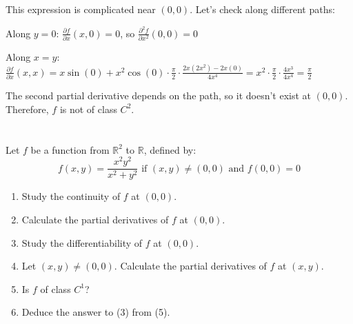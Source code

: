 \documentclass[12pt]{article}
\begin{document}
\begin{correctionbox}
This expression is complicated near $(0,0)$. Let's check along different paths:

Along $y=0$: $\frac{\partial f}{\partial x}(x,0) = 0$, so $\frac{\partial^2 f}{\partial x^2}(0,0) = 0$

Along $x=y$: $\frac{\partial f}{\partial x}(x,x) = x\sin(0) + x^2\cos(0) \cdot \frac{\pi}{2} \cdot \frac{2x(2x^2) - 2x(0)}{4x^4} = x^2 \cdot \frac{\pi}{2} \cdot \frac{4x^3}{4x^4} = \frac{\pi}{2}$

The second partial derivative depends on the path, so it doesn't exist at $(0,0)$. Therefore, $f$ is not of class $C^2$.
\end{correctionbox}

\section{}
Let $f$ be a function from $\mathbb{R}^2$ to $\mathbb{R}$, defined by:
$$f(x, y) = \frac{x^2y^2}{x^2 + y^2} \text{ if } (x, y) \neq (0, 0) \text{ and } f(0, 0) = 0$$

\begin{enumerate}
    \item Study the continuity of $f$ at $(0, 0)$.
    \item Calculate the partial derivatives of $f$ at $(0, 0)$.
    \item Study the differentiability of $f$ at $(0, 0)$.
    \item Let $(x, y) \neq (0, 0)$. Calculate the partial derivatives of $f$ at $(x, y)$.
    \item Is $f$ of class $C^1$?
    \item Deduce the answer to (3) from (5).
\end{enumerate}
\end{document}
